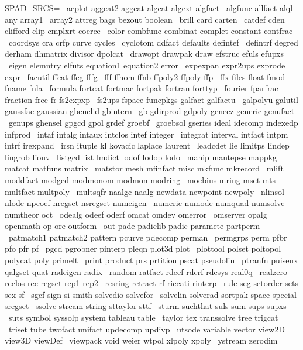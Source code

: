 \documentclass{article}
\begin{document}
SPAD_SRCS= \
     acplot aggcat2 aggcat algcat algext algfact \
     algfunc allfact alql any array1 \
     array2 attreg bags bezout boolean \
     brill card carten \
     catdef cden clifford clip cmplxrt coerce \
     color combfunc combinat complet constant contfrac \
     coordsys cra crfp curve cycles \
     cyclotom ddfact defaults defintef \
     defintrf degred derham dhmatrix divisor dpolcat \
     drawopt drawpak draw efstruc efuls efupxs \
     eigen elemntry elfuts equation1 equation2 error \
     expexpan expr2ups exprode expr \
     facutil ffcat ffcg fffg \
     fff ffhom ffnb ffpoly2 ffpoly ffp \
     ffx files float fmod fname fnla \
     formula fortcat fortmac fortpak fortran forttyp \
     fourier fparfrac fraction free fr fs2expxp \
     fs2ups fspace funcpkgs galfact galfactu \
     galpolyu galutil gaussfac gaussian gbeuclid gbintern \
     gb gdirprod gdpoly geneez generic genufact \
     genups ghensel gpgcd gpol grdef groebf \
     groebsol gseries ideal idecomp indexedp infprod \
     intaf intalg intaux intclos intef integer \
     integrat interval intfact intpm intrf irexpand \
     irsn ituple kl kovacic laplace laurent \
     leadcdet lie limitps lindep lingrob liouv \
     listgcd list lmdict lodof lodop lodo \
     manip mantepse mappkg matcat matfuns matrix \
     matstor mesh mfinfact misc mkfunc mkrecord \
     mlift moddfact modgcd modmonom modmon modring \
     moebius mring mset mts multfact multpoly \
     multsqfr naalgc naalg newdata newpoint newpoly \
     nlinsol nlode npcoef nregset nsregset numeigen \
     numeric numode numquad numsolve numtheor oct \
     odealg odeef oderf omcat omdev omerror \
     omserver opalg openmath op ore outform \
     out pade padiclib padic paramete partperm \
     patmatch1 patmatch2 pattern pcurve pdecomp perman \
     permgrps perm pfbr pfo pfr pf \
     pgcd pgrobner pinterp pleqn plot3d plot \
     plottool polset poltopol polycat poly primelt \
     print product prs prtition pscat pseudolin \
     ptranfn puiseux qalgset quat radeigen radix \
     random ratfact rdeef rderf rdesys real0q \
     realzero reclos rec regset rep1 rep2 \
     resring retract rf riccati rinterp \
     rule seg setorder sets sex sf \
     sgcf sign si smith solvedio solvefor \
     solvelin solverad sortpak space special sregset \
     ssolve stream string sttaylor sttf \
     sturm suchthat suls sum sups supxs \
     suts symbol syssolp system tableau table \
     taylor tex transsolve tree trigcat \
     triset tube twofact unifact updecomp updivp \
     utsode variable vector view2D view3D viewDef \
     viewpack void weier wtpol xlpoly xpoly \
     ystream zerodim
\end{document}
